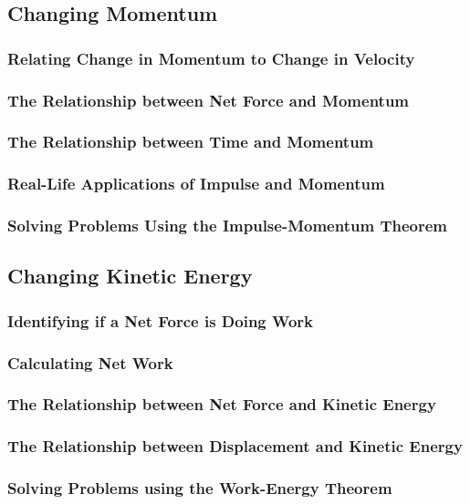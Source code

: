 \documentclass[../main-physics-problems.tex]{subfiles}
\begin{document}
\subsection{Changing Momentum}
\subsubsection{Relating Change in Momentum to Change in Velocity}
\subsubsection{The Relationship between Net Force and Momentum}
\subsubsection{The Relationship between Time and Momentum}
\subsubsection{Real-Life Applications of Impulse and Momentum}
\subsubsection{Solving Problems Using the Impulse-Momentum Theorem}
\subsection{Changing Kinetic Energy}
\subsubsection{Identifying if a Net Force is Doing Work}
\subsubsection{Calculating Net Work}
\subsubsection{The Relationship between Net Force and Kinetic Energy}
\subsubsection{The Relationship between Displacement and Kinetic Energy}
\subsubsection{Solving Problems using the Work-Energy Theorem}
\end{document}

